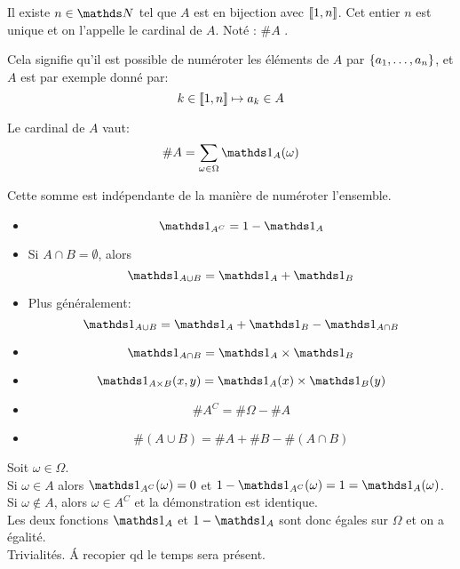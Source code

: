   \begin{definition}
    Il existe $n\in\NN$ tel que $A$ est en bijection avec $\left\llbracket1,n\right\rrbracket$.
    Cet entier $n$ est unique et on l'appelle le cardinal de $A$.
    Noté : $\#A$ .%
  \end{definition}

  Cela signifie qu'il est possible de numéroter les éléments de $A$ par
  $\left\{a_1, \dots, a_n\right\}$, et $A$ est par exemple donné par:
  \[ k \in \left\llbracket1, n\right\rrbracket \mapsto a_k \in A\]

  \begin{proposition}
    Le cardinal de $A$ vaut:
    \[\#A = \sum_{\omega\in \Omega} \indic_A(\omega)\]

    Cette somme est indépendante de la manière de numéroter l'ensemble.
  \end{proposition}

  \begin{proposition}
    \begin{itemize}
      \item \[\indic_{A^C} = 1-\indic_A\]
      \item Si $A\cap B = \emptyset$, alors
            \[\indic_{A\cup B} = \indic_A + \indic_B\]
      \item Plus généralement:
            \[\indic_{A\cup B} = \indic_A + \indic_B - \indic_{A\cap B}\]
      \item \[\indic_{A\cap B} = \indic_A \times \indic_B\]
      \item \[\indic_{A\times B}(x,y) = \indic_A(x)\times \indic_B(y)\]
    \end{itemize}
  \end{proposition}

  \begin{corollaire}
    \begin{itemize}
      \item \[\#A^C = \#\Omega - \#A\]
      \item \[
        \#(A\cup B) = \#A + \#B - \#(A\cap B)
      \]
    \end{itemize}
  \end{corollaire}

  \begin{preuve}
    Soit $\omega\in\Omega$.\\
    Si $\omega\in A$ alors $\indic_{A^C}(\omega)=0$ et
       $1-\indic_{A^C}(\omega) = 1 = \indic_A(\omega)$.\\
    Si $\omega\notin A$, alors $\omega\in A^C$ et la démonstration est
    identique.\\
    Les deux fonctions $\indic_A$ et $1-\indic_A$ sont donc égales sur
    $\Omega$ et on a égalité.\\

    Trivialités. \'A recopier qd le temps sera présent.


  \end{preuve}
